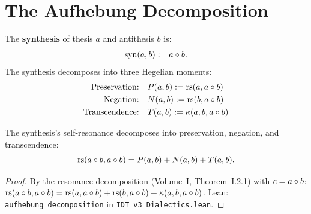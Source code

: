 \section{The Aufhebung Decomposition}

\begin{definition}
\label{def:synthesis}
The \textbf{synthesis} of thesis $a$ and antithesis $b$ is:
\[
\mathrm{syn}(a, b) := a \circ b.
\]
The synthesis decomposes into three Hegelian moments:
\begin{align}
\text{Preservation:} &\quad P(a,b) := \mathrm{rs}(a, a \circ b) \\
\text{Negation:} &\quad N(a,b) := \mathrm{rs}(b, a \circ b) \\
\text{Transcendence:} &\quad T(a,b) := \kappa(a, b, a \circ b)
\end{align}
\end{definition}

\begin{theorem}
\label{thm:aufhebung}
The synthesis's self-resonance decomposes into preservation, negation, and
transcendence:
\[
\mathrm{rs}(a \circ b, a \circ b) = P(a,b) + N(a,b) + T(a,b).
\]
\end{theorem}

\begin{proof}
By the resonance decomposition (Volume~I, Theorem~I.2.1) with
$c = a \circ b$:
$\mathrm{rs}(a \circ b, a \circ b) = \mathrm{rs}(a, a \circ b) + \mathrm{rs}(b, a \circ b) + \kappa(a, b, a \circ b)$.
Lean: \texttt{aufhebung\_decomposition} in \texttt{IDT\_v3\_Dialectics.lean}.
\end{proof}

